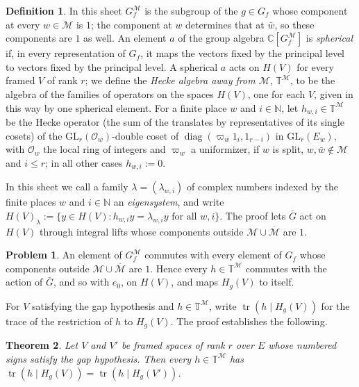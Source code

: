 \documentclass[reqno]{amsart}
\theoremstyle{plain}
\newtheorem{theorem}{Theorem}[section]
\theoremstyle{definition}
\newtheorem{problem}{Problem}[section]
\newtheorem{definition}[theorem]{Definition}
\newcommand{\C}{\mathbb{C}}
\newcommand{\Oc}{\mathcal{O}}
\newcommand{\Mcal}{\mathcal{M}}
\newcommand{\TM}{\mathbb{T}^{\mathcal{M}}}
\newcommand{\tr}{\operatorname{tr}}
\begin{document}
\begin{definition}\label{def:hecke-away}
In this sheet \(G_f^{\Mcal}\) is the subgroup of the \(g \in G_f\) whose component at every \(w \in \Mcal\) is \(1\); the component at \(w\) determines that at \(\bar w\), so these components are \(1\) as well.  An element \(a\) of the group algebra \(\C[G_f^{\Mcal}]\) is \emph{spherical} if, in every representation of \(G_f\), it maps the vectors fixed by the principal level to vectors fixed by the principal level.  A spherical \(a\) acts on \(H(V)\) for every framed \(V\) of rank \(r\); we define the \emph{Hecke algebra away from \(\Mcal\)}, \(\TM\), to be the algebra of the families of operators on the spaces \(H(V)\), one for each \(V\), given in this way by one spherical element.  For a finite place \(w\) and \(i \in \mathbb N\), let \(h_{w,i} \in \TM\) be the Hecke operator (the sum of the translates by representatives of its single cosets) of the \(\mathrm{GL}_r(\Oc_w)\)-double coset of \(\operatorname{diag}(\varpi_w 1_i, 1_{r-i})\) in \(\mathrm{GL}_r(E_w)\), with \(\Oc_w\) the local ring of integers and \(\varpi_w\) a uniformizer, if \(w\) is split, \(w, \bar w \notin \Mcal\) and \(i \le r\); in all other cases \(h_{w,i} := 0\).
\end{definition}

In this sheet we call a family \(\lambda = (\lambda_{w,i})\) of complex numbers indexed by the finite places \(w\) and \(i \in \mathbb N\) an \emph{eigensystem}, and write \(H(V)_\lambda := \{y \in H(V) : h_{w,i} y = \lambda_{w,i} y \text{ for all } w, i\}\).  The proof lets \(\bar G\) act on \(H(V)\) through integral lifts whose components outside \(\Mcal \cup \overline{\Mcal}\) are \(1\).

\begin{problem}\label{pr:commute}
An element of \(G_f^{\Mcal}\) commutes with every element of \(G_f\) whose components outside \(\Mcal \cup \overline{\Mcal}\) are \(1\).  Hence every \(h \in \TM\) commutes with the action of \(\bar G\), and so with \(e_0\), on \(H(V)\), and maps \(H_g(V)\) to itself.
\end{problem}

For \(V\) satisfying the gap hypothesis and \(h \in \TM\), write \(\tr(h \mid H_g(V))\) for the trace of the restriction of \(h\) to \(H_g(V)\).  The proof establishes the following.

\begin{theorem}\label{thm:equal-traces}
Let \(V\) and \(V'\) be framed spaces of rank \(r\) over \(E\) whose numbered signs satisfy the gap hypothesis.  Then every \(h \in \TM\) has \(\tr(h \mid H_g(V)) = \tr(h \mid H_g(V'))\).
\end{theorem}
\end{document}
